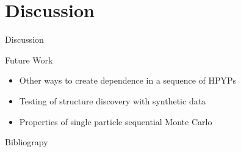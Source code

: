 \documentclass{beamer}
\begin{document}
\section{Discussion}

\begin{frame}[t]{Discussion}
	\begin{block}{Future Work}
		\begin{itemize}
			\item Other ways to create dependence in a sequence of HPYPs
			\item Testing of structure discovery with synthetic data
			\item Properties of single particle sequential Monte Carlo
		\end{itemize}
	\end{block}
\end{frame}

\begin{frame}[t,allowframebreaks]{Bibliograpy}
	
\end{frame}
\end{document}
